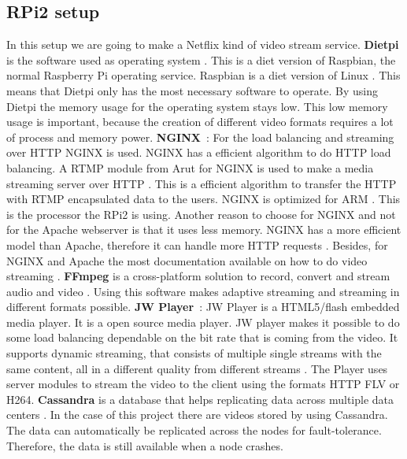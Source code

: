 \documentclass{sig-alternate-br}
\begin{document}
\subsection{RPi2 setup}\label{sec:setup}
In this setup we are going to make a Netflix kind of video stream service. \newline
\textbf{Dietpi} is the software used as operating system \cite{dietpi}. This is a diet version of Raspbian, the normal Raspberry Pi operating service. Raspbian is a diet version of Linux \cite{raspberry-pi}. This means that Dietpi only has the most necessary software to operate. By using Dietpi the memory usage for the operating system stays low. This low memory usage is important, because the creation of different video formats requires a lot of process and memory power. \newline
\textbf{NGINX}~\cite{nginx}: For the load balancing and streaming over HTTP NGINX is used. NGINX has a efficient algorithm to do HTTP load balancing. A RTMP module from Arut for NGINX is used to make a media streaming server over HTTP \cite{arut}. This is a efficient algorithm to transfer the HTTP with RTMP encapsulated data to the users. NGINX is optimized for ARM \cite{nginx}. This is the processor the RPi2 is using. Another reason to choose for NGINX and not for the Apache webserver is that it uses less memory. NGINX has a more efficient model than Apache, therefore it can handle more HTTP requests \cite{nginxvsapache}. Besides, for NGINX and Apache the most documentation available on how to do video streaming \cite{nginxvsapache}. \newline
\textbf{FFmpeg} is a cross-platform solution to record, convert and stream audio and video \cite{ffmpeg}. Using this software makes adaptive streaming and streaming in different formats possible. \newline
\textbf{JW Player}~\cite{jwplayer}: JW Player is a HTML5/flash embedded media player. It is a open source media player. JW player makes it possible to do some load balancing dependable on the bit rate that is coming from the video. It supports dynamic streaming, that consists of multiple single streams with the same content, all in a different quality from different streams \cite{jwplayer}. The Player uses server modules to stream the video to the client using the formats HTTP FLV or H264.\newline
\textbf{Cassandra} is a database that helps replicating data across multiple data centers \cite{cassandra}. In the case of this project there are videos stored by using Cassandra. The data can automatically be replicated across the nodes for fault-tolerance. Therefore, the data is still available when a node crashes.
\end{document}

